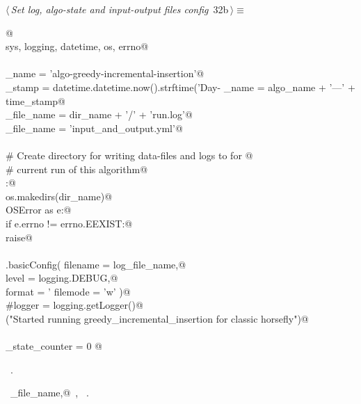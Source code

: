 \documentclass[11.5pt]{report}
\begin{document}
\begin{flushleft} \small\label{scrap34}\raggedright\small
{} $\langle\,${\itshape Set log, algo-state and input-output files config}\nobreak\ {\footnotesize {32b}}$\,\rangle\equiv$
\vspace{-1ex}
\begin{list}{}{} \item
\mbox{}\verb@  @\\
\mbox{}\verb@import sys, logging, datetime, os, errno@\\
\mbox{}\verb@@\\
\mbox{}\verb@algo_name     = 'algo-greedy-incremental-insertion'@\\
\mbox{}\verb@time_stamp    = datetime.datetime.now().strftime('Day-%Y-%m-%d_ClockTime-%H:%M:%S')@\\
\mbox{}\verb@dir_name      = algo_name + '---' + time_stamp@\\
\mbox{}\verb@log_file_name = dir_name + '/' + 'run.log'@\\
\mbox{}\verb@io_file_name  = 'input_and_output.yml'@\\
\mbox{}\verb@@\\
\mbox{}\verb@# Create directory for writing data-files and logs to for @\\
\mbox{}\verb@# current run of this algorithm@\\
\mbox{}\verb@try:@\\
\mbox{}\verb@    os.makedirs(dir_name)@\\
\mbox{}\verb@except OSError as e:@\\
\mbox{}\verb@    if e.errno != errno.EEXIST:@\\
\mbox{}\verb@        raise@\\
\mbox{}\verb@@\\
\mbox{}\verb@logging.basicConfig( filename = log_file_name,@\\
\mbox{}\verb@                     level    = logging.DEBUG,@\\
\mbox{}\verb@                     format   = '%(asctime)s: %(levelname)s: %(message)s',@\\
\mbox{}\verb@                     filemode = 'w' )@\\
\mbox{}\verb@#logger = logging.getLogger()@\\
\mbox{}\verb@info("Started running greedy_incremental_insertion for classic horsefly")@\\
\mbox{}\verb@@\\
\mbox{}\verb@algo_state_counter = 0 @\\
\mbox{}\verb@@{\NWsep}
\end{list}
\vspace{-1.5ex}
\footnotesize
\begin{list}{}{\setlength{\itemsep}{-\parsep}\setlength{\itemindent}{-\leftmargin}}
\item \NWtxtMacroRefIn\ .
\item \NWtxtIdentsDefed\nobreak\  \verb@io_file_name,@\nobreak\ , \verb@logger@\nobreak\ .
\item{}
\end{list}
\vspace{4ex}
\end{flushleft}
\end{document}
